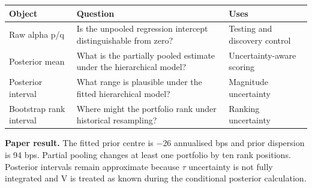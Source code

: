 \begin{longtable}[]{@{}p{}p{}p{}@{}}
\toprule\noalign{}
Object & Question & Uses \\
\midrule\noalign{}
\endhead
\bottomrule\noalign{}
\endlastfoot
Raw alpha p/q & Is the unpooled regression intercept distinguishable
from zero? & Testing and discovery control \\
Posterior mean & What is the partially pooled estimate under the
hierarchical model? & Uncertainty-aware scoring \\
Posterior interval & What range is plausible under the fitted
hierarchical model? & Magnitude uncertainty \\
Bootstrap rank interval & Where might the portfolio rank under
historical resampling? & Ranking uncertainty \\
\end{longtable}

\textbf{Paper result.} The fitted prior centre is \ensuremath{-}26 annualised bps and
prior dispersion is 94 bps. Partial pooling changes at least one
portfolio by ten rank positions. Posterior intervals remain approximate
because \ensuremath{\tau } uncertainty is not fully integrated and V is treated as known
during the conditional posterior calculation.

